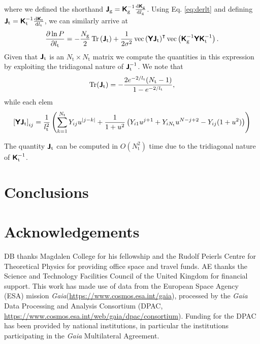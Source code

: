 \documentclass[fleqn,usenatbib]{mnras}
\newcommand{\gaia}{{\it Gaia}\xspace}
\begin{document}
where we defined the shorthand $\textbf{\textsf{J}}_\text{g} = \textbf{\textsf{K}}_\text{g}^{-1} \frac{\text{d}\textbf{\textsf{K}}_\text{g}}{\text{d}l_\text{g}}$. Using Eq. \ref{eq:derlt} and defining $\textbf{\textsf{J}}_\text{t} = \textbf{\textsf{K}}_\text{t}^{-1} \frac{\text{d}\textbf{\textsf{K}}_\text{t}}{\text{d}l_\text{t}}$, we can similarly arrive at
\begin{equation}
    \frac{\partial\ln P}{\partial l_\text{t}}= -\frac{N_\text{g}}{2}\operatorname{Tr}\left(\textbf{\textsf{J}}_\text{t}\right) + \frac{1}{2\sigma^2}\operatorname{vec}\left(\textbf{\textsf{Y}}\textbf{\textsf{J}}_\text{t}\right)^\intercal \operatorname{vec}\left(\textbf{\textsf{K}}_\text{g}^{-1}\textbf{\textsf{Y}}\textbf{\textsf{K}}_\text{t}^{-1}\right).
\end{equation}
Given that $\textbf{\textsf{J}}_\text{t}$ is an $N_\text{t} \times N_\text{t}$ matrix we compute the quantities in this expression by exploiting the tridiagonal nature of $\textbf{\textsf{J}}_\text{t}^{-1}$. We note that
\begin{equation}
    \operatorname{Tr}(\textbf{\textsf{J}}_\text{t}) = -\frac{2e^{-2/l_\text{t}}(N_\text{t}-1)}{1-e^{-2/l_\text{t}}},
\end{equation}
while each elem
\begin{equation}
    \left[\textbf{\textsf{Y}}\textbf{\textsf{J}}_\text{t}\right]_{ij} = \frac{1}{l_\text{t}^2}\left(\sum_{k=1}^{N_\text{t}}Y_{ij}u^{|j-k|} +\frac{1}{1+u^2}\left(Y_{i1}u^{j+1}+Y_{iN_\text{t}}u^{N-j+2} - Y_{ij}(1+u^2)\right)\right)
\end{equation}

The quantity $\textbf{\textsf{J}}_\text{t}$ can be computed in $O(N_\text{t}^2)$ time due to the tridiagonal nature of $\textbf{\textsf{K}}_\text{t}^{-1}$.


\section{Conclusions}
\label{sec:conclusion}


\section*{Acknowledgements}
DB thanks Magdalen College for his fellowship and the Rudolf Peierls Centre for Theoretical Physics for providing office space and travel funds. AE thanks the Science and Technology Facilities Council of
the United Kingdom for financial support. This work has made use of data from the European Space Agency (ESA) mission \gaia (\url{https://www.cosmos.esa.int/gaia}), processed by the \gaia
Data Processing and Analysis Consortium (DPAC,
\url{https://www.cosmos.esa.int/web/gaia/dpac/consortium}). Funding for the DPAC
has been provided by national institutions, in particular the institutions
participating in the \gaia Multilateral Agreement.
\end{document}
